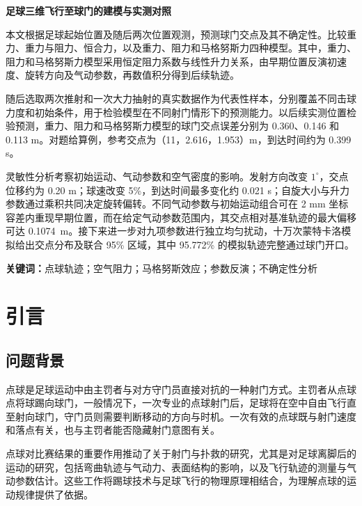 \documentclass[12pt,letterpaper]{article}
\newcommand{\SensitivityConditionalShift}{0.1074}
\begin{document}
\begin{center}
{\Large\bfseries 足球三维飞行至球门的建模与实测对照\par}
\vspace{2mm}{\bfseries 题目 B\par}
\vspace{3mm}{\bfseries 摘要\par}
\end{center}
\noindent\hspace*{\parindent}本文根据足球起始位置及随后两次位置观测，预测球门交点及其不确定性。比较重力、重力与阻力、恒合力，以及重力、阻力和马格努斯力四种模型。其中，重力、阻力和马格努斯力模型采用恒定阻力系数与线性升力关系，由早期位置反演初速度、旋转方向及气动参数，再数值积分得到后续轨迹。

随后选取两次推射和一次大力抽射的真实数据作为代表性样本，分别覆盖不同击球力度和初始条件，用于检验模型在不同射门情形下的预测能力。以后续实测位置检验预测，重力、阻力和马格努斯力模型的球门交点误差分别为 0.360、0.146 和 0.113 m。对题给算例，参考交点为（11，2.616，1.953）m，到达时间约为 0.399 s。

灵敏性分析考察初始运动、气动参数和空气密度的影响。发射方向改变 $1^\circ$，交点位移约为 0.20 m；球速改变 5\%，到达时间最多变化约 0.021 s；自旋大小与升力参数通过乘积共同决定旋转偏转。不同气动参数与初始运动组合可在 2 mm 坐标容差内重现早期位置，而在给定气动参数范围内，其交点相对基准轨迹的最大偏移可达 \SensitivityConditionalShift\ m。接下来进一步对九项参数进行独立均匀扰动，十万次蒙特卡洛模拟给出交点分布及联合 95\% 区域，其中 95.772\% 的模拟轨迹完整通过球门开口。

\noindent\textbf{关键词：}点球轨迹；空气阻力；马格努斯效应；参数反演；不确定性分析
\newpage\begingroup\normalfont\normalsize\setlength{\baselineskip}{13.2pt}\tableofcontents\endgroup\newpage
\section{引言}
\subsection{问题背景}
点球是足球运动中由主罚者与对方守门员直接对抗的一种射门方式。主罚者从点球点将球踢向球门，一般情况下，一次专业的点球射门后，足球将在空中自由飞行直至射向球门，守门员则需要判断移动的方向与时机。一次有效的点球既与射门速度和落点有关，也与主罚者能否隐藏射门意图有关。

点球对比赛结果的重要作用推动了关于射门与扑救的研究，尤其是对足球离脚后的运动的研究，包括弯曲轨迹与气动力\cite{maponi}、表面结构的影响\cite{asai2007,paudel}，以及飞行轨迹的测量与气动参数估计\cite{goff2009}。这些工作将踢球技术与足球飞行的物理原理相结合，为理解点球的运动规律提供了依据。
\end{document}
